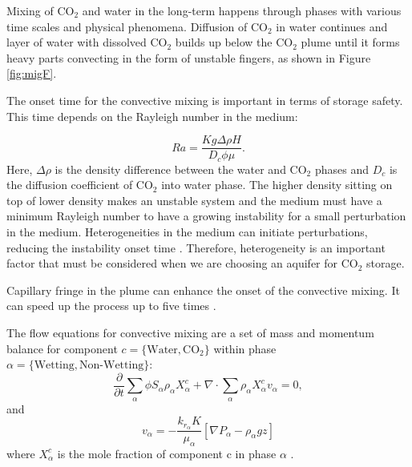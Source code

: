 Mixing of $\mbox{CO}_2$ and water in the long-term happens through phases with various time scales and physical phenomena. Diffusion of
$\mbox{CO}_2$ in water continues and layer of water with dissolved
$\mbox{CO}_2$ builds up below the $\mbox{CO}_2$ plume until it forms heavy parts convecting in
the form of unstable fingers, as shown in Figure \ref{fig:migF}.

The onset time for the convective mixing is important in terms of storage
safety. This time depends on the Rayleigh number in the medium:

\begin{equation}
 Ra = \frac{Kg\Delta \rho H}{D_c \phi \mu}.
 \label{Ra}
\end{equation} Here, $\Delta \rho$ is the density difference between the water and
$\mbox{CO}_2$ phases and $D_c$ is the diffusion coefficient of $\mbox{CO}_2$
into water phase. The higher density sitting on top of lower density makes an
unstable system and the medium must have a minimum Rayleigh number to
have a growing instability for a small perturbation in the medium.
Heterogeneities in the medium can initiate perturbations, reducing the
instability onset time \cite{hassanzadeh2005modelling,elenius2012time}.
Therefore, heterogeneity is an important factor that must be considered when we
are choosing an aquifer for $\mbox{CO}_2$ storage.

Capillary fringe in the plume can enhance the onset of the convective mixing. It can
speed up the process up to five times \cite{eleniuseffects}.

The flow equations for convective mixing are a set of mass and momentum balance
for component $c=\{\mbox{Water},\mbox{CO}_2\}$ within phase
$\alpha=\{\mbox{Wetting},\mbox{Non-Wetting}\}$:
\begin{equation}
\frac{\partial}{\partial t} \underset{\alpha}{\sum}\phi S_\alpha \rho_\alpha
X_{\alpha}^c + \nabla \cdot \underset{\alpha}{\sum} \rho_\alpha X_{\alpha}^c
v_\alpha = 0,   
 \label{eq:massCo2}
\end{equation} and 
\begin{equation}
 v_\alpha = -\frac{k_{r_\alpha}K}{\mu_\alpha} \left[  \nabla
P_\alpha-\rho_\alpha g z \right]
 \label{eq:darcyCo2}
\end{equation} where $X_{\alpha}^c$ is the mole fraction of
component $\mbox{c}$ in phase $\alpha$ \cite{elenius2010co2}. 

